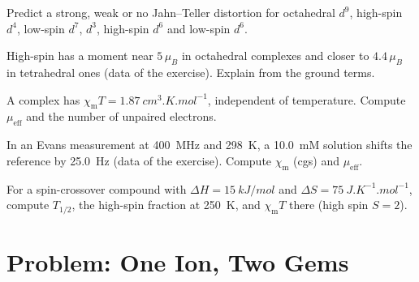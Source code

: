 \begin{exercise}[$\star\star$]\label{exo:b3:complex-spectra-magnetism:8}
Predict a strong, weak or no Jahn--Teller distortion for octahedral $d^9$, high-spin
$d^4$, low-spin $d^7$, $d^3$, high-spin $d^6$ and low-spin $d^6$.
\end{exercise}

\begin{exercise}[$\star\star$]\label{exo:b3:complex-spectra-magnetism:9}
High-spin  has a moment near $5\,\mu_B$ in octahedral complexes and closer to
$4.4\,\mu_B$ in tetrahedral ones (data of the exercise). Explain from the ground
terms.
\end{exercise}

\begin{exercise}[$\star\star\star$]\label{exo:b3:complex-spectra-magnetism:10}
A complex has $\chi_{\mathrm m}T = \qty{1.87}{cm^3.K.mol^{-1}}$, independent of temperature. Compute $\mu_{\mathrm{eff}}$ and
the number of unpaired electrons.
\end{exercise}

\begin{exercise}[$\star\star\star$]\label{exo:b3:complex-spectra-magnetism:11}
In an Evans measurement at \qty{400}{MHz} and \qty{298}{K}, a \qty{10.0}{mM} solution shifts the
reference by \qty{25.0}{Hz} (data of the exercise). Compute $\chi_{\mathrm m}$ (cgs) and $\mu_{\mathrm{eff}}$.
\end{exercise}

\begin{exercise}[$\star\star\star$]\label{exo:b3:complex-spectra-magnetism:12}
For a spin-crossover compound with $\Delta H = \qty{15}{kJ/mol}$ and $\Delta S = \qty{75}{J.K^{-1}.mol^{-1}}$, compute $T_{1/2}$,
the high-spin fraction at \qty{250}{K}, and $\chi_{\mathrm m}T$ there (high spin $S = 2$).
\end{exercise}

\section{Problem: One Ion, Two Gems}

